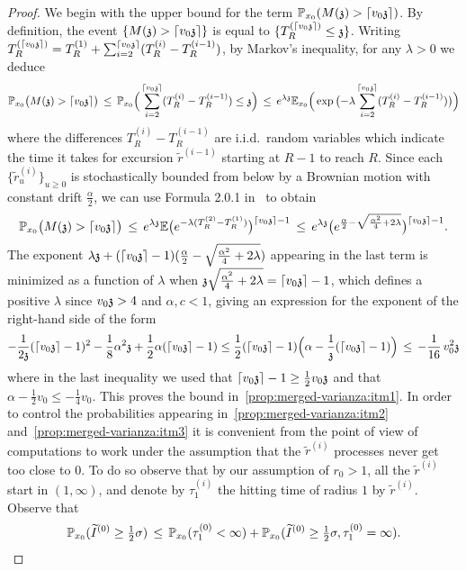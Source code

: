\begin{proof}
We begin with the upper bound for the term $\PP_{x_0}(M(\ss)>\lceil v_0\ss\rceil)$. By definition, the event $\{M(\ss)>  \lceil v_0\ss \rceil\}$ is equal to $\{T^{(\lceil v_0\ss\rceil)}_R\leq\ss\}$. Writing $T^{(\lceil v_0\ss\rceil)}_R=T^{(1)}_R+\sum_{i=2}^{\lceil v_0\ss\rceil}(T^{(i)}_R-T^{(i-1)}_R)$,  by Markov's inequality, for any $\lambda>0$ we deduce
\[\PP_{x_0}\big(M(\ss)>\lceil v_0\ss\rceil\big)\,\leq\,\PP_{x_0}\Big(\sum_{i=2}^{\lceil v_0\ss\rceil}(T^{(i)}_R-T^{(i-1)}_R)\leq\ss\Big)\,\leq\,e^{\lambda \ss}\EE_{x_0}\Big(\exp\big({-}\lambda\sum_{i=2}^{\lceil v_0\ss\rceil}(T^{(i)}_R-T^{(i-1)}_R)\big)\Big)\]
where the differences $T^{(i)}_R-T^{(i-1)}_R$ are i.i.d.~random variables which indicate the time it takes for excursion $\widetilde{r}^{(i-1)}$ starting at $R-1$ to reach $R$. Since each $\{\widetilde{r}^{(i)}_u\}_{u\geq 0}$ is stochastically bounded from below by a Brownian motion with constant drift $\tfrac{\alpha}{2}$, we can use Formula 2.0.1 in~\cite{Borodin2002} to obtain
\[\PP_{x_0}\big(M(\ss)>\lceil v_0\ss\rceil\big)\,\leq\,e^{\lambda \ss}\EE\big(e^{-\lambda(T^{(2)}_R-T^{(1)}_R)}\big)^{\lceil v_0\ss\rceil-1}\,\leq\,e^{\lambda \ss}\big( e^{\frac{\alpha}{2}-\sqrt{\frac{\alpha^2}{4}+2\lambda}}\big)^{\lceil v_0\ss\rceil-1}.\]
The exponent $\lambda\ss+(\lceil v_0\ss\rceil-1)(\frac{\alpha}{2}-\sqrt{\frac{\alpha^2}{4}+2\lambda})$ appearing in the last term is minimized as a function of $\lambda$ when $\ss\sqrt{\tfrac{\alpha^2}{4}+2\lambda}=\lceil v_0\ss\rceil-1$, which defines a positive $\lambda$ since $v_0\ss>4$ and $\alpha,c<1$, giving an expression for the exponent of the right-hand side of the form %
\[-\frac{1}{2\ss}(\lceil v_0\ss\rceil-1)^2-\frac{1}{8}\alpha^2\ss+\frac{1}{2}\alpha(\lceil v_0\ss\rceil-1)\leq\frac12(\lceil v_0\ss\rceil-1)\Big(\alpha-\frac{1}{\ss}(\lceil v_0\ss\rceil-1)\Big)\,\leq\,-\frac{1}{16}\,v_0^2\ss\]
where in the last inequality we used that $\lceil v_0\ss\rceil-1\geq \frac12v_0\ss$ and that $\alpha-\frac12v_0\leq -\frac14 v_0$. This proves the bound in~\eqref{prop:merged-varianza:itm1}. In order to control the probabilities appearing in~\eqref{prop:merged-varianza:itm2} and~\eqref{prop:merged-varianza:itm3} it is convenient from the point of view of computations to work under the assumption that the $\widetilde{r}^{(i)}$ processes never get too close to $0$. To do so observe that by our assumption of $r_0>1$, all the $\widetilde{r}^{(i)}$ start in $(1,\infty)$, and denote by $\tau^{(i)}_1$ the hitting time of radius $1$ by $\widetilde{r}^{(i)}$. Observe that \[\PP_{x_0}(\tI^{(0)}\geq\tfrac12\sigma)\,\leq\,\PP_{x_0}(\tau_{1}^{(0)}<\infty)+\PP_{x_0}(\tI^{(0)}\geq\tfrac12\sigma, \tau^{(0)}_{1}=\infty).\]

\end{proof}
